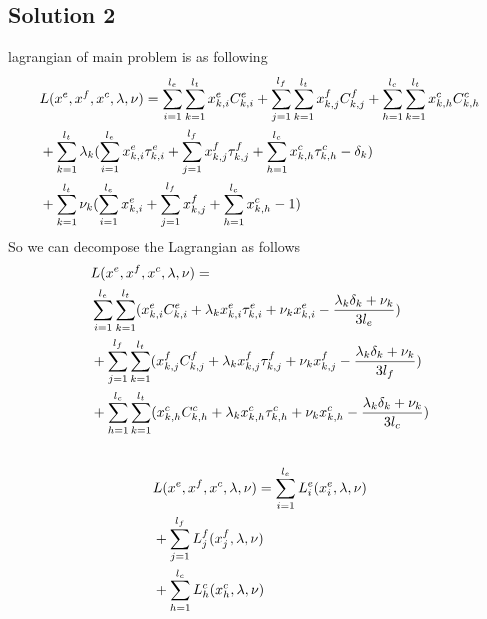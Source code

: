 \documentclass[conference]{IEEEtran}
\begin{document}
    \subsection{Solution 2}
    lagrangian of main problem is as following
    \begin{subequations}
      \begin{align}
        &L(x^e,x^f,x^c,\lambda,\nu) = \sum_{i=1}^{l_e} \sum_{k=1}^{l_t} x_{k,i}^e C_{k,i}^e
        +\sum_{j=1}^{l_f} \sum_{k=1}^{l_t} x_{k,j}^f C_{k,j}^f
        +\sum_{h=1}^{l_c} \sum_{k=1}^{l_t} x_{k,h}^c C_{k,h}^c \\ \notag
        &+\sum_{k=1}^{l_t}\lambda_k(\sum_{i=1}^{l_e}x_{k,i}^e\tau_{k,i}^e
        +\sum_{j=1}^{l_f}x_{k,j}^f\tau_{k,j}^f
        +\sum_{h=1}^{l_c}x_{k,h}^c\tau_{k,h}^c
        -\delta_k) \\ \notag
        &+\sum_{k=1}^{l_t}\nu_k(\sum_{i=1}^{l_e}x_{k,i}^e+\sum_{j=1}^{l_f}x_{k,j}^f+\sum_{h=1}^{l_c}x_{k,h}^c-1)
      \end{align}
    \end{subequations}
    So we can decompose the Lagrangian as follows
    \begin{subequations}
      \begin{align}
        &L(x^e,x^f,x^c,\lambda,\nu) = \\ \notag
        &\sum_{i=1}^{l_e} \sum_{k=1}^{l_t} (x_{k,i}^e C_{k,i}^e +\lambda_kx_{k,i}^e\tau_{k,i}^e +\nu_kx_{k,i}^e - \frac{\lambda_k\delta_k +\nu_k}{3l_e} ) \\ \notag
        &+\sum_{j=1}^{l_f} \sum_{k=1}^{l_t} (x_{k,j}^f C_{k,j}^f +\lambda_kx_{k,j}^f\tau_{k,j}^f +\nu_kx_{k,j}^f - \frac{\lambda_k\delta_k +\nu_k}{3l_f}) \\ \notag
        &+\sum_{h=1}^{l_c} \sum_{k=1}^{l_t} (x_{k,h}^c C_{k,h}^c +\lambda_kx_{k,h}^c\tau_{k,h}^c +\nu_kx_{k,h}^c - \frac{\lambda_k\delta_k +\nu_k}{3l_c}) \\ \notag
      \end{align}
    \end{subequations}
    \begin{subequations}
      \begin{align}
        &L(x^e,x^f,x^c,\lambda,\nu) = \sum_{i=1}^{l_e} L_{i}^e(x_{i}^e,\lambda,\nu) \\ \notag
        &+\sum_{j=1}^{l_f} L_{j}^f(x_{j}^f,\lambda,\nu) \\ \notag
        &+\sum_{h=1}^{l_c} L_{h}^c(x_{h}^c,\lambda,\nu) \\ \notag
      \end{align}
    \end{subequations}
\end{document}
